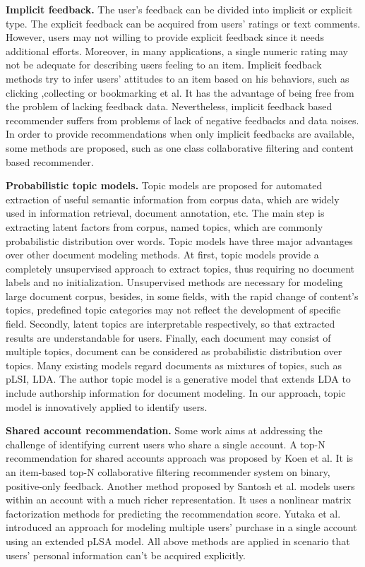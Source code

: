 \documentclass{llncs}
\begin{document}
\textbf{Implicit feedback.} The user's feedback can be divided into implicit  or explicit type. The explicit feedback can be acquired from users' ratings or text comments. However,  users may not willing to provide explicit feedback since it needs additional efforts. Moreover, in many applications, a single numeric rating may not be adequate for describing users feeling to an item. Implicit feedback methods\cite{song:mining} try to infer users' attitudes to an item based on his behaviors, such as clicking ,collecting or bookmarking et al. It has the advantage of being free from the problem of lacking feedback data. Nevertheless, implicit feedback based recommender suffers from problems of lack of negative feedbacks and data noises. In order to provide recommendations when only implicit feedbacks are available, some methods are proposed, such as one class collaborative filtering and content based recommender.\par


\textbf{Probabilistic topic models.}  Topic models\cite{blei:lda}\cite{mic:atm}\cite{mark:prob} are proposed for automated extraction of useful semantic information from corpus data, which are widely used in information retrieval, document annotation, etc. The main step is extracting latent factors from corpus, named topics, which are commonly probabilistic distribution over words. Topic models have three major advantages over other document modeling methods. At first, topic models provide a completely unsupervised approach to extract topics, thus requiring no document labels and no initialization. Unsupervised methods are necessary for modeling large document corpus, besides, in some fields, with the rapid change of content's topics, predefined topic categories may not reflect the development of specific field. Secondly, latent topics are interpretable respectively, so that extracted results are understandable for users. Finally, each document may consist of multiple topics, document can be considered as probabilistic distribution over topics. Many existing models regard documents as mixtures of topics, such as pLSI, LDA. The author topic model is a generative model that extends LDA to include authorship information for document modeling. In our approach, topic model is innovatively applied to identify users. \par

\textbf{Shared account recommendation.} Some work aims at addressing the challenge of identifying current users who share a single account. A top-N recommendation for shared accounts approach was proposed by Koen et al.\cite{koen:top-n} It is an item-based top-N collaborative filtering recommender system on binary, positive-only feedback. Another method proposed by Santosh et al.\cite{kabbur:nlmf} models users within an account with a much richer representation. It uses a nonlinear matrix factorization methods for predicting the recommendation score. Yutaka et al.\cite{yutaka:modeling} introduced an approach for modeling multiple users' purchase in a single account using an extended pLSA model. All above methods are applied in scenario that users' personal information can't be acquired explicitly.
\end{document}
